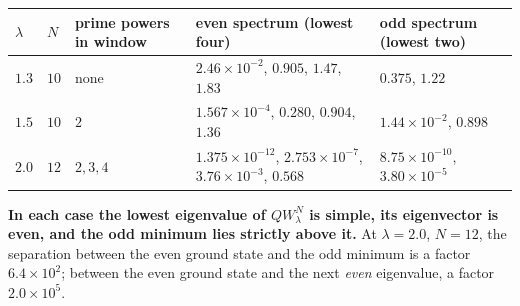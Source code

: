 \documentclass[
  letterpaper,
  11pt]{article}
\newcounter{none} %
\theoremstyle{plain}
\theoremstyle{definition}
\theoremstyle{remark}
\begin{document}
{\def\LTcaptype{none} %
\begin{longtable}[]{@{}
  >{\raggedright\arraybackslash}p{}
  >{\raggedright\arraybackslash}p{}
  >{\raggedright\arraybackslash}p{}
  >{\raggedright\arraybackslash}p{}
  >{\raggedright\arraybackslash}p{}@{}}
\toprule\noalign{}
\begin{minipage}[b]{\linewidth}\raggedright
\(\lambda\)
\end{minipage} & \begin{minipage}[b]{\linewidth}\raggedright
\(N\)
\end{minipage} & \begin{minipage}[b]{\linewidth}\raggedright
prime powers in window
\end{minipage} & \begin{minipage}[b]{\linewidth}\raggedright
even spectrum (lowest four)
\end{minipage} & \begin{minipage}[b]{\linewidth}\raggedright
odd spectrum (lowest two)
\end{minipage} \\
\midrule\noalign{}
\endhead
\bottomrule\noalign{}
\endlastfoot
\(1.3\) & \(10\) & none & \(2.46\times10^{-2}\), \(0.905\), \(1.47\), \(1.83\) & \(0.375\), \(1.22\) \\
\(1.5\) & \(10\) & \(2\) & \(1.567\times10^{-4}\), \(0.280\), \(0.904\), \(1.36\) & \(1.44\times10^{-2}\), \(0.898\) \\
\(2.0\) & \(12\) & \(2,3,4\) & \(1.375\times10^{-12}\), \(2.753\times10^{-7}\), \(3.76\times10^{-3}\), \(0.568\) & \(8.75\times10^{-10}\), \(3.80\times10^{-5}\) \\
\end{longtable}
}

\textbf{In each case the lowest eigenvalue of \(QW^N_\lambda\) is simple, its eigenvector is even, and the odd minimum lies strictly above it.} At \(\lambda = 2.0\), \(N = 12\), the separation between the even ground state and the odd minimum is a factor \(6.4\times10^2\); between the even ground state and the next \emph{even} eigenvalue, a factor \(2.0\times10^5\).
\end{document}
